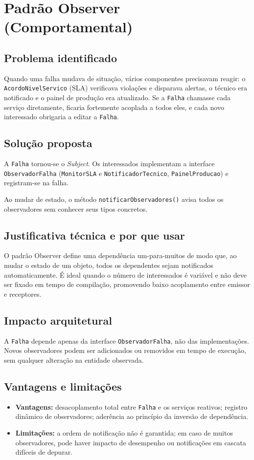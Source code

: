 \documentclass[10pt]{article}
\begin{document}
\newpage

\section{Padrão Observer (Comportamental)}

\subsection{Problema identificado}
Quando uma falha mudava de situação, vários componentes precisavam reagir: o
\texttt{AcordoNivelServico} (SLA) verificava violações e disparava alertas, o
técnico era notificado e o painel de produção era atualizado. Se a \texttt{Falha}
chamasse cada serviço diretamente, ficaria fortemente acoplada a todos eles, e
cada novo interessado obrigaria a editar a \texttt{Falha}.
\subsection{Solução proposta}
A \texttt{Falha} tornou-se o \textit{Subject}. Os interessados implementam a
interface \texttt{ObservadorFalha} (\texttt{MonitorSLA} e
\texttt{NotificadorTecnico}, \texttt{PainelProducao}) e registram-se na falha.

Ao mudar de estado, o método \texttt{notificarObservadores()} avisa todos os
observadores sem conhecer seus tipos concretos.

\subsection{Justificativa técnica e por que usar}
O padrão Observer define uma dependência um-para-muitos de modo que, ao mudar o
estado de um objeto, todos os dependentes sejam notificados automaticamente.
É ideal quando o número de interessados é variável e não deve ser fixado em
tempo de compilação, promovendo baixo acoplamento entre emissor e receptores.

\subsection{Impacto arquitetural}
A \texttt{Falha} depende apenas da interface \texttt{ObservadorFalha}, não das
implementações. Novos observadores podem ser adicionados ou removidos em tempo
de execução, sem qualquer alteração na entidade observada.

\subsection{Vantagens e limitações}
\begin{itemize}[leftmargin=*]
    \item \textbf{Vantagens:} desacoplamento total entre \texttt{Falha} e os
    serviços reativos; registro dinâmico de observadores; aderência ao princípio
    da inversão de dependência.
    \item \textbf{Limitações:} a ordem de notificação não é garantida; em caso de
    muitos observadores, pode haver impacto de desempenho ou notificações em
    cascata difíceis de depurar.
\end{itemize}
\end{document}
